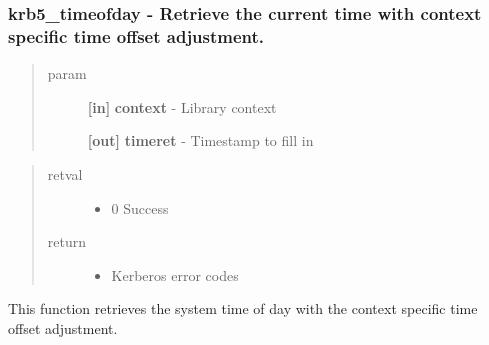 \documentclass[letterpaper,10pt,english]{sphinxmanual}
\begin{document}
\subsubsection{krb5\_timeofday -  Retrieve the current time with context specific time offset adjustment.}
\label{appdev/refs/api/krb5_timeofday:krb5-timeofday-retrieve-the-current-time-with-context-specific-time-offset-adjustment}\label{appdev/refs/api/krb5_timeofday::doc}

\begin{fulllineitems}
\label{appdev/refs/api/krb5_timeofday:c.krb5_timeofday}
\end{fulllineitems}

\begin{quote}\begin{description}
\item[{param}] \leavevmode
\textbf{{[}in{]}} \textbf{context} - Library context

\textbf{{[}out{]}} \textbf{timeret} - Timestamp to fill in

\end{description}\end{quote}
\begin{quote}\begin{description}
\item[{retval}] \leavevmode\begin{itemize}
\item {} 
0   Success

\end{itemize}

\item[{return}] \leavevmode\begin{itemize}
\item {} 
Kerberos error codes

\end{itemize}

\end{description}\end{quote}

This function retrieves the system time of day with the context specific time offset adjustment.
\end{document}
